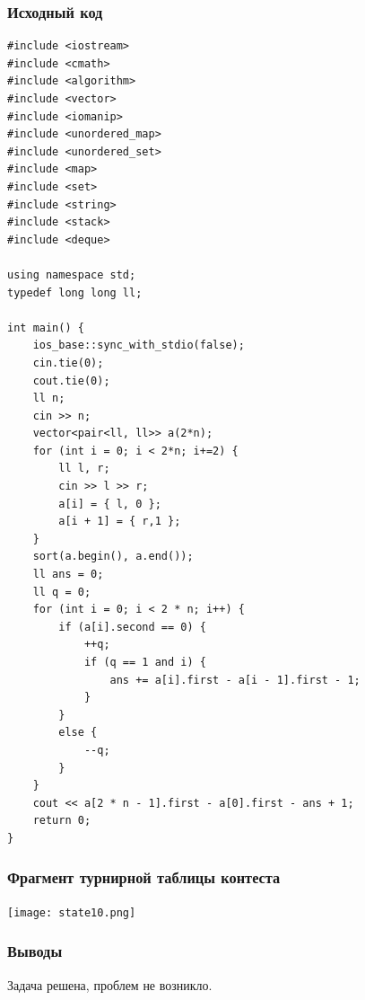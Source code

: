 \subsubsection*{Исходный код}
\begin{lstlisting}
#include <iostream>
#include <cmath>
#include <algorithm>
#include <vector>
#include <iomanip>
#include <unordered_map>
#include <unordered_set>
#include <map>
#include <set>
#include <string>
#include <stack>
#include <deque>

using namespace std;
typedef long long ll;

int main() {
    ios_base::sync_with_stdio(false);
    cin.tie(0);
    cout.tie(0);
    ll n;
    cin >> n;
    vector<pair<ll, ll>> a(2*n);
    for (int i = 0; i < 2*n; i+=2) {
        ll l, r;
        cin >> l >> r;
        a[i] = { l, 0 };
        a[i + 1] = { r,1 };
    }
    sort(a.begin(), a.end());
    ll ans = 0;
    ll q = 0;
    for (int i = 0; i < 2 * n; i++) {
        if (a[i].second == 0) {
            ++q;
            if (q == 1 and i) {
                ans += a[i].first - a[i - 1].first - 1;
            }
        }
        else {
            --q;
        }
    }
    cout << a[2 * n - 1].first - a[0].first - ans + 1;
    return 0;
}
\end{lstlisting}
\subsubsection*{Фрагмент турнирной таблицы контеста}
\begin{center}
\texttt{[image: state10.png]}\newline\noindent
\end{center}

\subsubsection*{Выводы}
Задача решена, проблем не возникло.
